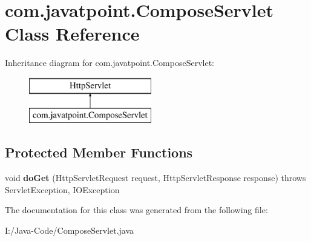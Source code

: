 \hypertarget{classcom_1_1javatpoint_1_1_compose_servlet}{}\section{com.\+javatpoint.\+Compose\+Servlet Class Reference}
\label{classcom_1_1javatpoint_1_1_compose_servlet}
Inheritance diagram for com.\+javatpoint.\+Compose\+Servlet\+:\begin{figure}[H]
\begin{center}
\leavevmode
\includegraphics[height=2.000000cm]{classcom_1_1javatpoint_1_1_compose_servlet}
\end{center}
\end{figure}
\subsection*{Protected Member Functions}
\begin{DoxyCompactItemize}
\item 
\mbox{\label{classcom_1_1javatpoint_1_1_compose_servlet_a08b37ca4aa3dfb7b5f2ac061770ae853}} 
void {\bfseries do\+Get} (Http\+Servlet\+Request request, Http\+Servlet\+Response response)  throws Servlet\+Exception, I\+O\+Exception 
\end{DoxyCompactItemize}


The documentation for this class was generated from the following file\+:\begin{DoxyCompactItemize}
\item 
I\+:/\+Java-\/\+Code/Compose\+Servlet.\+java\end{DoxyCompactItemize}
